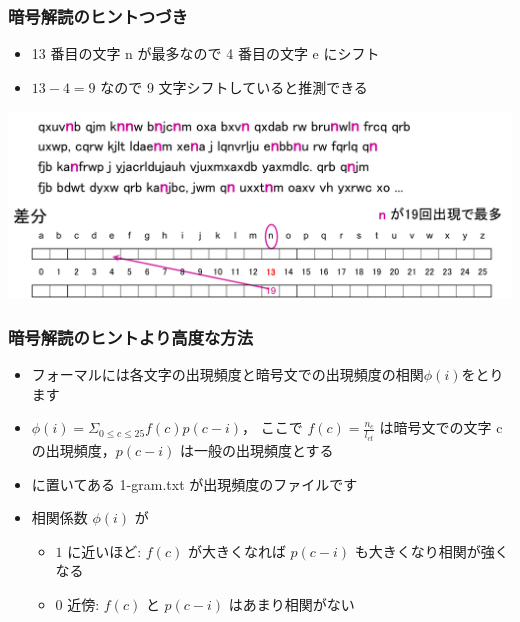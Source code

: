\begin{frame}
\frametitle{暗号解読のヒント\textemdash つづき}
  \begin{itemize}
\item 13 番目の文字 n が最多なので 4 番目の文字 e にシフト
\item \(13-4=9\) なので 9 文字シフトしていると推測できる
  \end{itemize}
  \begin{center}
\includegraphics[scale=0.3]{./Figure/elementaryCS-figHindo.pdf}
  \end{center}
\end{frame}
\begin{frame}
\frametitle{暗号解読のヒント\textemdash より高度な方法}
  \begin{itemize}
\item フォーマルには各文字の出現頻度と暗号文での出現頻度の相関\(\phi(i)\)をとります
\item \(\phi(i)=\Sigma_{0\leq c\leq 25}f(c)p(c-i)\)， ここで \(f(c)=\frac{n_c}{l_{ct}}\) は暗号文での文字 c の出現頻度，\(p(c-i)\) は一般の出現頻度とする
\item \href{https://sites.google.com/a/presystems.xyz/sample/home/elementary-computer-science}{}に置いてある 1-gram.txt が出現頻度のファイルです
\item 相関係数 \(\phi(i)\) が
    \begin{itemize}
\item $1$ に近いほど: \(f(c)\) が大きくなれば \(p(c-i)\) も大きくなり相関が強くなる
\item $0$ 近傍: \(f(c)\) と \(p(c-i)\) はあまり相関がない
    \end{itemize}
  \end{itemize}
\end{frame}
